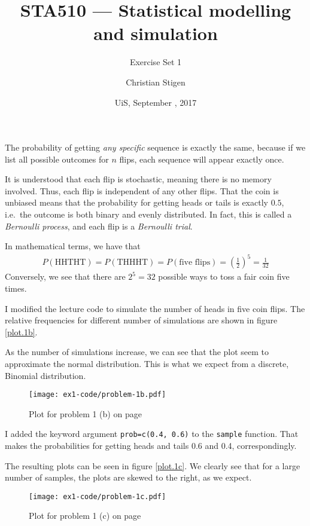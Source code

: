 \documentclass[a4paper,english,12pt]{article}
\title{STA510 --- Statistical modelling and simulation}
\subtitle{Exercise Set 1}
\author{Christian Stigen}
\date{UiS, September \nth{21}, 2017}
\begin{document}
\maketitle

The probability of getting \textit{any specific} sequence is exactly the same,
because if we list all possible outcomes for $n$ flips, each sequence will
appear exactly once.

It is understood that each flip is stochastic, meaning there is no memory
involved. Thus, each flip is independent of any other flips. That the coin is
unbiased means that the probability for getting heads or tails is exactly
$0.5$, i.e.~the outcome is both binary and evenly distributed. In fact, this is
called a \textit{Bernoulli process}, and each flip is a \textit{Bernoulli
trial}.

In mathematical terms, we have that
\begin{align*}
  P(\textrm{HHTHT}) = P(\textrm{THHHT}) = P(\textrm{five flips}) =
    \left(\frac{1}{2}\right)^5 = \frac{1}{32}
\end{align*}
Conversely, we see that there are $2^5 = 32$ possible ways to toss a fair coin
five times.

I modified the lecture code to simulate the number of heads in five coin flips.
The relative frequencies for different number of simulations are shown in
figure \vref{plot.1b}.

As the number of simulations increase, we can see that the plot seem to
approximate the normal distribution. This is what we expect from a discrete,
Binomial distribution.
\begin{figure}[h]
  \texttt{[image: ex1-code/problem-1b.pdf]}
  \caption{Plot for problem 1 (b) on page \pageref{problem.1 (b)}}
  \label{plot.1b}
\end{figure}

I added the keyword argument \texttt{prob=c(0.4, 0.6)} to the \texttt{sample}
function. That makes the probabilities for getting heads and tails 0.6 and 0.4,
correspondingly.

The resulting plots can be seen in figure \vref{plot.1c}. We clearly see that
for a large number of samples, the plots are skewed to the right, as we expect.
\begin{figure}[h]
  \texttt{[image: ex1-code/problem-1c.pdf]}
  \caption{Plot for problem 1 (c) on page \pageref{problem.1 (c)}}
  \label{plot.1c}
\end{figure}
\end{document}
